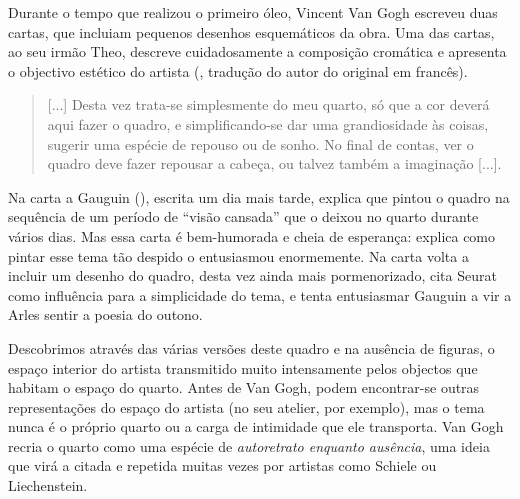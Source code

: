 \documentclass{article}
\begin{document}
Durante o tempo que realizou o primeiro óleo, Vincent Van Gogh
escreveu duas cartas, que incluiam pequenos desenhos esquemáticos da
obra. Uma das cartas, ao seu irmão Theo, descreve cuidadosamente a
composição cromática e apresenta o objectivo estético do artista
(\cite{facsimile}, tradução do autor do original em francês).

\begin{quote}
  [...]  Desta vez trata-se simplesmente do meu quarto, só que a cor
  deverá aqui fazer o quadro, e simplificando-se dar uma grandiosidade
  às coisas, sugerir uma espécie de repouso ou de sonho. No final de
  contas, ver o quadro deve fazer repousar a cabeça, ou talvez também
  a imaginação [...].
\end{quote}

Na carta a Gauguin (\cite{facsimile2}), escrita um dia mais tarde,
explica que pintou o quadro na sequência de um período de ``visão
cansada'' que o deixou no quarto durante vários dias. Mas essa carta é
bem-humorada e cheia de esperança: explica como pintar esse tema tão
despido o entusiasmou enormemente. Na carta volta a incluir um desenho
do quadro, desta vez ainda mais pormenorizado, cita Seurat como
influência para a simplicidade do tema, e tenta entusiasmar Gauguin a
vir a Arles sentir a poesia do outono.

Descobrimos através das várias versões deste quadro e na ausência de
figuras, o espaço interior do artista transmitido muito intensamente
pelos objectos que habitam o espaço do quarto. Antes de Van Gogh,
podem encontrar-se outras representações do espaço do artista (no seu
atelier, por exemplo), mas o tema nunca é o próprio quarto ou a carga
de intimidade que ele transporta. Van Gogh recria o quarto como uma
espécie de \emph{autoretrato enquanto ausência}, uma ideia que virá a
citada e repetida muitas vezes por artistas como Schiele ou
Liechenstein.

\printbibliography[heading=bibliography,title={Bibliografia}]
\end{document}
